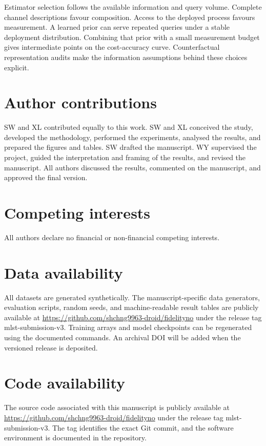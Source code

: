 \documentclass[12pt]{iopart}
\begin{document}
Estimator selection follows the available information and query volume. Complete channel descriptions favour composition. Access to the deployed process favours measurement. A learned prior can serve repeated queries under a stable deployment distribution. Combining that prior with a small measurement budget gives intermediate points on the cost-accuracy curve. Counterfactual representation audits make the information assumptions behind these choices explicit.

\section*{Author contributions}

 SW and XL contributed equally to this work. SW and XL conceived the study, developed the methodology, performed the experiments, analysed the results, and prepared the figures and tables. SW drafted the manuscript. WY supervised the project, guided the interpretation and framing of the results, and revised the manuscript. All authors discussed the results, commented on the manuscript, and approved the final version.

\section*{Competing interests}

All authors declare no financial or non-financial competing interests.

\section*{Data availability}

All datasets are generated synthetically. The manuscript-specific data generators, evaluation scripts, random seeds, and machine-readable result tables are publicly available at \url{https://github.com/shchng9963-droid/fidelityno} under the release tag mlst-submission-v3. Training arrays and model checkpoints can be regenerated using the documented commands. An archival DOI will be added when the versioned release is deposited.

\section*{Code availability}

The source code associated with this manuscript is publicly available at \url{https://github.com/shchng9963-droid/fidelityno} under the release tag mlst-submission-v3. The tag identifies the exact Git commit, and the software environment is documented in the repository.
\end{document}
